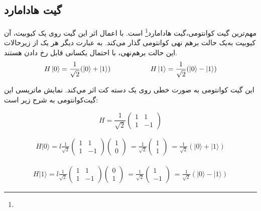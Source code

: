 \documentclass{book}
\begin{document}
\subsection*{گیت هادامارد}
مهم‌ترین گیت کوانتومی،‌گیت هادامارد\footnote{} است. با اعمال اثر این گیت روی یک کیوبیت، آن کیوبیت به‌یک حالت برهم نهی‌ کوانتومی‌ گذار‌ می‌کند. به عبارت دیگر هر یک از زیرحالات این حالت برهم‌نهی، با احتمال یکسانی قابل رخ دادن‌ هستند. 
\vspace{1cm}
$$
H\ket{0} = \frac{1}{\sqrt{2}} (\ket{0} + \ket{1})
\hspace{2cm}
H\ket{1} = \frac{1}{\sqrt{2}} (\ket{0} - \ket{1})
$$
\vspace{1cm}

این گیت کوانتومی‌ به صورت خطی روی یک دسته‌ کت اثر مي‌کند. نمایش ماتریسی این گیت‌کوانتومی به شرح زیر است:
\begin{center}
	\[
	H = \frac{1}{\sqrt{2}}
	\begin{pmatrix}
		1 & 1 \\
		1 & -1
	\end{pmatrix}
	\]
\end{center}





\begin{align*}
	H |0\rangle = l\frac{1}{\sqrt{2}} \begin{pmatrix} 1 & 1 \\ 1 & -1 \end{pmatrix} \begin{pmatrix} 1 \\ 0 \end{pmatrix} \
	= \frac{1}{\sqrt{2}} \begin{pmatrix} 1 \\ 1 \end{pmatrix} \
	= \frac{1}{\sqrt{2}} (|0\rangle + |1\rangle)
\end{align*}

\begin{align*}
	H |1\rangle = l\frac{1}{\sqrt{2}} \begin{pmatrix} 1 & 1 \\ 1 & -1 \end{pmatrix} \begin{pmatrix} 0 \\ 1 \end{pmatrix} \
	= \frac{1}{\sqrt{2}} \begin{pmatrix} 1 \\ -1 \end{pmatrix} \
	= \frac{1}{\sqrt{2}} (|0\rangle - |1\rangle)
\end{align*}
\end{document}
